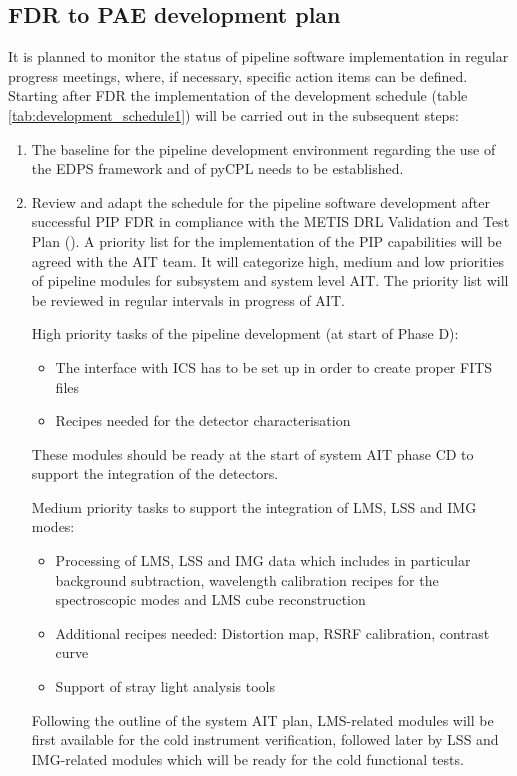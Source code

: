 \subsection{FDR to PAE development plan}
\label{ssec:fdr2pae}

It is planned to monitor the status of pipeline software implementation in regular progress meetings, where, if necessary, specific action items can be defined. Starting after FDR the implementation of the development schedule (table \ref{tab:development_schedule1}) will be carried out in the subsequent steps:

\begin{enumerate}
    \item The baseline for the pipeline development environment regarding the use of the \ac{EDPS} framework and of pyCPL needs to be established.
    
    \item Review and adapt the schedule for the pipeline software development after successful PIP FDR in compliance with the METIS DRL Validation and Test Plan (\cite{DRLVT}). A priority list for the implementation of the PIP capabilities will be agreed with the AIT team. It will categorize high, medium and low priorities of pipeline modules for subsystem and system level AIT. The priority list will be reviewed in regular intervals in progress of AIT.
   
    High priority tasks of the pipeline development (at start of Phase D): 
    \begin{itemize}
        \item The interface with ICS has to be set up in order to create proper FITS files 
        \item Recipes needed for the detector characterisation
    \end{itemize} 
    These modules should be ready at the start of system AIT phase CD to support the integration of the detectors.
    
    Medium priority tasks to support the integration of \ac{LMS}, \ac{LSS} and \ac{IMG} modes:
    \begin{itemize}
        \item Processing of LMS, LSS and IMG data which includes in particular background subtraction, wavelength calibration recipes for the spectroscopic modes and LMS cube reconstruction
        \item Additional recipes needed: Distortion map, RSRF calibration, contrast curve
        \item Support of stray light analysis tools
    \end{itemize}
    Following the outline of the system AIT plan, LMS-related modules will be first available for the cold instrument verification, followed later by LSS and IMG-related modules which will be ready for the cold functional tests.


\end{enumerate}
